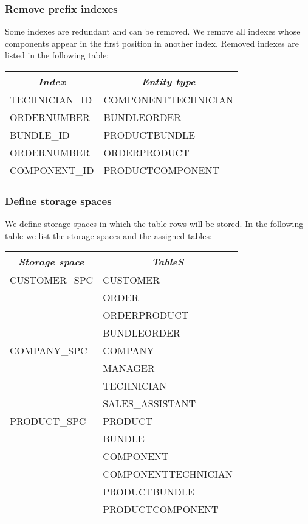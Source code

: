 \documentclass[11pt]{article}
\begin{document}
\subsubsection*{Remove prefix indexes}

Some indexes are redundant and can be removed. We remove all indexes whose components appear in the first position in another index. Removed indexes are listed in the following table:

\begin{tabular}[t]{*{2}{l}}
\hline
\multicolumn{1}{c|}{\emph{Index}}       &
\multicolumn{1}{c}{\emph{Entity type}}  \\
\hline
TECHNICIAN\_ID & COMPONENTTECHNICIAN \\
ORDERNUMBER    & BUNDLEORDER         \\
BUNDLE\_ID     & PRODUCTBUNDLE       \\
ORDERNUMBER    & ORDERPRODUCT        \\
COMPONENT\_ID  & PRODUCTCOMPONENT    \\
\hline
\end{tabular}


\subsubsection*{Define storage spaces}

We define storage spaces in which the table rows will be stored. In the following table we list the storage spaces and the assigned tables:

\begin{tabular}[t]{*{2}{l}}
\hline
\multicolumn{1}{c|}{\emph{Storage space}} &
\multicolumn{1}{c}{\emph{TableS}}         \\
\hline
CUSTOMER\_SPC & CUSTOMER            \\
              & ORDER               \\
              & ORDERPRODUCT        \\
              & BUNDLEORDER         \\
\hline
COMPANY\_SPC  & COMPANY             \\
              & MANAGER             \\
              & TECHNICIAN          \\
              & SALES\_ASSISTANT    \\
\hline
PRODUCT\_SPC  & PRODUCT             \\
              & BUNDLE              \\
              & COMPONENT           \\
              & COMPONENTTECHNICIAN \\
              & PRODUCTBUNDLE       \\
              & PRODUCTCOMPONENT    \\
\hline
\end{tabular}
\end{document}
